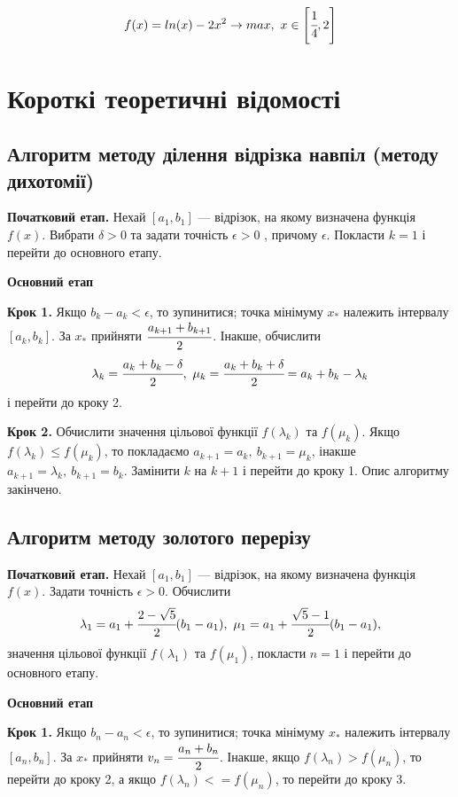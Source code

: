\documentclass[14pt,a4paper]{extarticle}
\theoremstyle{definition}
\newcommand{\sep}{ , \ \allowbreak }
\begin{document}
\[f(x)=ln(x) - 2x^2 \to max \sep x \in \left[\cfrac14, 2\right]\]

\section{Короткі теоретичні відомості}

\subsection{Алгоритм методу ділення відрізка навпіл (методу дихотомії)}

\textbf{Початковий етап.} Нехай $[a_1, b_1]$ --– відрізок, на якому визначена функція $f(x)$. Вибрати $\delta > 0$ та задати точність $\epsilon > 0$ , причому $\epsilon$. Покласти $k=1$ і перейти до основного етапу.

\textbf{Основний етап}

\textbf{Крок 1.} Якщо $b_k-a_k< \epsilon$, то зупинитися; точка мінімуму $x_*$ належить інтервалу $[a_k, b_k]$. За $x_*$ прийняти $\cfrac{a_{k+1}+b_{k+1}}2$. Інакше, обчислити
\[\lambda_k = \cfrac{a_k+b_k - \delta}2 \sep
\mu_k= \cfrac{a_k+b_k+\delta}2 = a_k+b_k-\lambda_k\]
і перейти до кроку 2.

\textbf{Крок 2.} Обчислити значення цільової функції $f(\lambda_k)$ та $f(\mu_k)$. Якщо $f(\lambda_k) \leq f(\mu_k)$, то покладаємо $a_{k+1} = a_k \sep b_{k+1}=\mu_k$, інакше $a_{k+1}=\lambda_k \sep b_{k+1}=b_k$.
Замінити $k$ на $k+1$ і перейти до кроку 1.
Опис алгоритму закінчено.

\subsection{Алгоритм методу золотого перерізу}

\textbf{Початковий етап.} Нехай $[a_1, b_1]$ --– відрізок, на якому визначена функція $f(x)$. Задати точність $\epsilon > 0$. Обчислити
\[\lambda_1 = a_1+\cfrac{2-\sqrt{5}}2(b_1-a_1) \sep \mu_1=a_1+\cfrac{\sqrt{5}-1}2(b_1-a_1),\]
значення цільової функції $f(\lambda_1)$ та $f(\mu_1)$, покласти $n=1$ і перейти до основного етапу.

\textbf{Основний етап}

\textbf{Крок 1.} Якщо $b_n-a_n< \epsilon$, то зупинитися; точка мінімуму $x_*$ належить інтервалу $[a_n,b_n]$. За $x_*$ прийняти $v_n=\cfrac{a_n+b_n}2$. Інакше, якщо $f(\lambda_n) > f(\mu_n)$, то перейти до кроку 2, а якщо $f(\lambda_n) <= f(\mu_n)$, то перейти до кроку 3.
\end{document}
